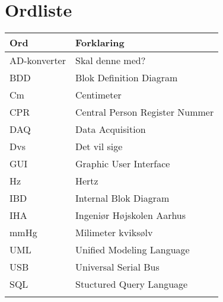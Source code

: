 \chapter{Ordliste}

\begin{longtabu} to 
    Ord &    Forklaring\\
    \toprule 
    AD-konverter & Skal denne med? \\
    BDD & Blok Definition Diagram \\	
	Cm & Centimeter\\    
    CPR &  Central Person Register Nummer\\
    DAQ & Data Acquisition\\
	Dvs & Det vil sige\\
	GUI & Graphic User Interface\\
	Hz & Hertz\\
	IBD & Internal Blok Diagram\\
	IHA & Ingeniør Højskolen Aarhus\\
	mmHg & Milimeter kviksølv\\
	UML & Unified Modeling Language\\
	USB & Universal Serial Bus\\
	SQL & Stuctured Query Language\\
	
\label{forkort}
\end{longtabu}